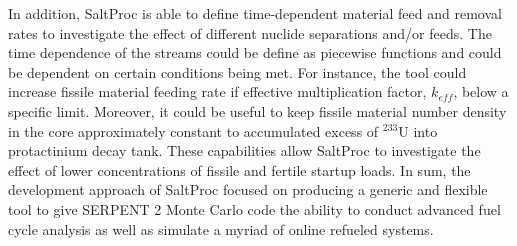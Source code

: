 In addition, SaltProc is able to define time-dependent material feed and removal rates to investigate the effect of different nuclide separations and/or feeds. The time dependence of the streams could be define as piecewise functions and could be dependent on certain conditions being met. For instance, the tool could increase fissile material feeding rate if effective multiplication factor, $k_{eff}$, below a specific limit. Moreover, it could be useful to keep fissile material number density in the core approximately constant to accumulated excess of $^{233}$U into protactinium decay tank. These capabilities allow SaltProc to investigate the effect of lower concentrations of fissile and fertile startup loads. In sum, the development approach of SaltProc focused on producing a generic and flexible tool to give SERPENT 2 Monte Carlo code the ability to conduct advanced fuel cycle analysis as well as simulate a myriad of online refueled systems.
